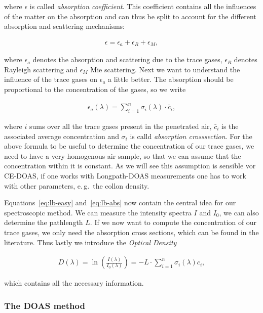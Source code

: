 where $\epsilon$ is called \emph{absorption coefficient}. This
coefficient contains all the influences of the matter on the
absorption and can thus be split to account for the different
absorption and scattering mechanisms:

\begin{align*}
  \epsilon = \epsilon_a + \epsilon_R + \epsilon_M,
\end{align*}

where $\epsilon_a$ denotes the absorption and scattering due to the
trace gases, $\epsilon_R$ denotes Rayleigh scattering and $\epsilon_M$
Mie scattering. Next we want to understand the influence of the trace
gases on $\epsilon_a$ a little better. The absorption should be
proportional to the concentration of the gases, so we write

\begin{align}
  \epsilon_a(\lambda) = \sum_{i=1}^n \sigma_i(\lambda) \cdot \bar c_i, \label{eq:lb-abs}
\end{align}

where $i$ sums over all the trace gases present in the penetrated
air, $\bar c_i$ is the associated average concentration and $\sigma_i$
is calld \emph{absorption crosssection}. For the above formula to be
useful to determine the concentration of our trace gases, we need to
have a very homogenous air sample, so that we can assume that the
concentration within it is constant. As we will see this assumption is
sensible vor CE-DOAS, if one works with Longpath-DOAS measurements one
has to work with other parameters, e.\,g.\ the collon density.

Equations~\eqref{eq:lb-easy} and~\eqref{eq:lb-abs} now contain the central idea for our
spectroscopic method. We can measure the intensity spectra $I$ and
$I_0$, we can also determine the pathlength $L$. If we now want to
compute the concentration of our trace gases, we only need the
absorption cross sections, which can be found in the
literature. Thus lastly we introduce the \emph{Optical
  Density} 

\begin{align*}
  D(\lambda) = \ln \left(\frac{I(\lambda)}{I_0(\lambda)}\right) = - L
  \cdot \sum_{i=1}^n \sigma_i(\lambda) c_i,
\end{align*}

which contains all the necessary information.

\subsubsection{The DOAS method}
\label{sec:doas}

